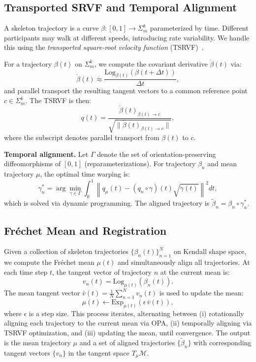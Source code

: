 \documentclass{article}
\begin{document}
\subsection{Transported SRVF and Temporal Alignment}
\label{sec:tsrvf}

A skeleton trajectory is a curve $\beta: [0,1] \to \Sigma_m^k$ parameterized by time. Different participants may walk at different speeds, introducing rate variability. We handle this using the \emph{transported square-root velocity function} (TSRVF)~\cite{amor2015action}.

For a trajectory $\beta(t)$ on $\Sigma_m^k$, we compute the covariant derivative $\dot{\beta}(t)$ via:
\begin{equation}
\dot{\beta}(t) \approx \frac{\mathrm{Log}_{\beta(t)}(\beta(t+\Delta t))}{\Delta t},
\end{equation}
and parallel transport the resulting tangent vectors to a common reference point $c \in \Sigma_m^k$. The TSRVF is then:
\begin{equation}
q(t) = \frac{\dot{\beta}(t)_{\beta(t) \to c}}{\sqrt{\|\dot{\beta}(t)_{\beta(t) \to c}\|}},
\end{equation}
where the subscript denotes parallel transport from $\beta(t)$ to $c$.

\textbf{Temporal alignment.} Let $\Gamma$ denote the set of orientation-preserving diffeomorphisms of $[0,1]$ (reparameterizations). For trajectory $\beta_n$ and mean trajectory $\mu$, the optimal time warping is:
\begin{equation}
\gamma_n^* = \arg\min_{\gamma \in \Gamma} \int_0^1 \left\| q_\mu(t) - (q_n \circ \gamma)(t)\sqrt{\dot{\gamma}(t)} \right\|^2 dt,
\end{equation}
which is solved via dynamic programming. The aligned trajectory is $\tilde{\beta}_n = \beta_n \circ \gamma_n^*$.

\subsection{Fr\'{e}chet Mean and Registration}
\label{sec:alignment}

Given a collection of skeleton trajectories $\{\beta_n(t)\}_{n=1}^N$ on Kendall shape space, we compute the Fr\'{e}chet mean $\mu(t)$ and simultaneously align all trajectories. At each time step $t$, the tangent vector of trajectory $n$ at the current mean is:
\begin{equation}
v_n(t) = \mathrm{Log}_{\mu(t)}(\beta_n(t)).
\end{equation}
The mean tangent vector $\bar{v}(t) = \frac{1}{N}\sum_{n=1}^N v_n(t)$ is used to update the mean:
\begin{equation}
\mu(t) \leftarrow \mathrm{Exp}_{\mu(t)}(\epsilon \, \bar{v}(t)),
\end{equation}
where $\epsilon$ is a step size. This process iterates, alternating between (i) rotationally aligning each trajectory to the current mean via OPA, (ii) temporally aligning via TSRVF optimization, and (iii) updating the mean, until convergence. The output is the mean trajectory $\mu$ and a set of aligned trajectories $\{\tilde{\beta}_n\}$ with corresponding tangent vectors $\{v_n\}$ in the tangent space $T_\mu \mathcal{M}$.
\end{document}
